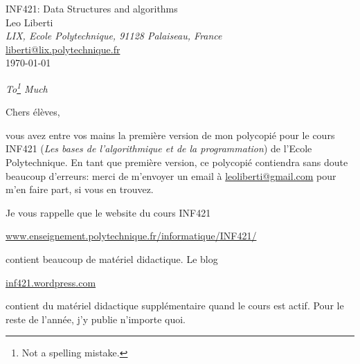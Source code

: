 \documentclass[a4paper]{book}
\theoremstyle{changebreak}                %
\begin{document}
\thispagestyle{empty}

\begin{center}
{\LARGE INF421: Data Structures and algorithms} \\ [4cm]
{\sc \Large Leo Liberti} \\ [1cm]
{\it LIX, Ecole Polytechnique, 91128 Palaiseau, France} \\ [1cm]
\url{liberti@lix.polytechnique.fr} \\ [4cm]
\today
\end{center}

\newpage

\thispagestyle{empty}
\vspace*{5cm}
\begin{flushright}
{\it To\footnote{Not a spelling mistake.} Much}
\end{flushright}

\newpage

\thispagestyle{empty}

Chers \'el\`eves,

vous avez entre vos mains la premi\`ere version de mon polycopi\'e
pour le cours INF421 ({\it Les bases de l'algorithmique et de la
programmation}) de l'Ecole Polytechnique. En tant que premi\`ere
version, ce polycopi\'e contiendra sans doute beaucoup d'erreurs:
merci de m'envoyer un email \`a \url{leoliberti@gmail.com} pour m'en
faire part, si vous en trouvez. 

Je vous rappelle que le website du cours INF421 
\begin{center}
\url{www.enseignement.polytechnique.fr/informatique/INF421/}
\end{center}
contient beaucoup de mat\'eriel didactique. Le blog
\begin{center}
\url{inf421.wordpress.com}
\end{center}
contient du mat\'eriel didactique suppl\'ementaire quand le cours est
actif. Pour le reste de l'ann\'ee, j'y publie n'importe quoi. 

\end{document}

